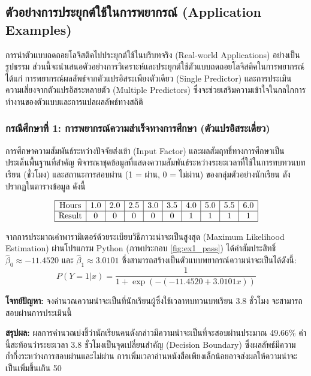 \subsection{ตัวอย่างการประยุกต์ใช้ในการพยากรณ์ (Application Examples)}

การนำตัวแบบถดถอยโลจิสติคไปประยุกต์ใช้ในบริบทจริง (Real-world Applications) อย่างเป็นรูปธรรม ส่วนนี้จะนำเสนอตัวอย่างการวิเคราะห์และประยุกต์ใช้ตัวแบบถดถอยโลจิสติคในการพยากรณ์ ได้แก่ การพยากรณ์ผลลัพธ์จากตัวแปรอิสระเพียงตัวเดียว (Single Predictor) และการประเมินความเสี่ยงจากตัวแปรอิสระหลายตัว (Multiple Predictors) ซึ่งจะช่วยเสริมความเข้าใจในกลไกการทำงานของตัวแบบและการแปลผลลัพธ์ทางสถิติ

\subsubsection{กรณีศึกษาที่ 1: การพยากรณ์ความสำเร็จทางการศึกษา (ตัวแปรอิสระเดี่ยว)}
การศึกษาความสัมพันธ์ระหว่างปัจจัยส่งเข้า (Input Factor) และผลสัมฤทธิ์ทางการศึกษาเป็นประเด็นพื้นฐานที่สำคัญ พิจารณาชุดข้อมูลที่แสดงความสัมพันธ์ระหว่างระยะเวลาที่ใช้ในการทบทวนบทเรียน (ชั่วโมง) และสถานะการสอบผ่าน (1 = ผ่าน, 0 = ไม่ผ่าน) ของกลุ่มตัวอย่างนักเรียน ดังปรากฏในตารางข้อมูล ดังนี้ 

$$ \begin{array}{|c|c|c|c|c|c|c|c|c|c|}
\hline
\text{Hours} & 1.0 & 2.0 & 2.5 & 3.0 & 3.5 & 4.0 & 5.0 & 5.5 & 6.0 \\
\hline
\text{Result} & 0 & 0 & 0 & 0 & 0 & 1 & 1 & 1 & 1 \\
\hline
\end{array}$$

จากการประมาณค่าพารามิเตอร์ด้วยระเบียบวิธีภาวะน่าจะเป็นสูงสุด (Maximum Likelihood Estimation) ผ่านโปรแกรม Python (ภาพประกอบ \ref{fig:ex1_pass}) ได้ค่าสัมประสิทธิ์ $\hat{\beta}_0 \approx -11.4520$ และ $\hat{\beta}_1 \approx 3.0101$ ซึ่งสามารถสร้างเป็นตัวแบบพยากรณ์ความน่าจะเป็นได้ดังนี้:
$$P(Y=1|x) = \frac{1}{1 + \exp(-(-11.4520 + 3.0101x))}$$

\noindent
\textbf{โจทย์ปัญหา:} จงคำนวณความน่าจะเป็นที่นักเรียนผู้ซึ่งใช้เวลาทบทวนบทเรียน 3.8 ชั่วโมง จะสามารถสอบผ่านการประเมินนี้
\textbf{สรุปผล:} ผลการคำนวณบ่งชี้ว่านักเรียนคนดังกล่าวมีความน่าจะเป็นที่จะสอบผ่านประมาณ 49.66\% ค่านี้สะท้อนว่าระยะเวลา 3.8 ชั่วโมงเป็นจุดเปลี่ยนสำคัญ (Decision Boundary) ซึ่งผลลัพธ์มีความก้ำกึ่งระหว่างการสอบผ่านและไม่ผ่าน การเพิ่มเวลาอ่านหนังสือเพียงเล็กน้อยอาจส่งผลให้ความน่าจะเป็นเพิ่มขึ้นเกิน 50%

